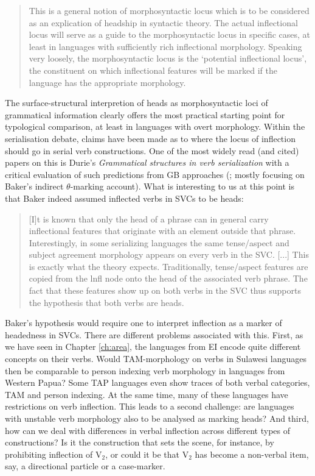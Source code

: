 \begin{quote}
This is a general notion of morphosyntactic locus which is to be considered as an explication of headship in syntactic theory. The actual inflectional locus will serve as a guide to the morphosyntactic locus in specific cases, at least in languages with sufficiently rich inflectional morphology. Speaking very loosely, the morphosyntactic locus is the `potential inflectional locus', the constituent on which inflectional features will be marked if the language has the appropriate morphology. \citep[6]{zwicky1985heads1}
\end{quote}

The surface-structural interpretion of heads as morphosyntactic loci of grammatical information clearly offers the most practical starting point for typological comparison, at least in languages with overt morphology. Within the serialisation debate, claims have been made as to where the locus of inflection should go in serial verb constructions. One of the most widely read (and cited) papers on this is Durie's \textit{Grammatical structures in verb serialization} with a critical evaluation of such predictions from GB approaches (\citealt{Durie1997}; mostly focusing on Baker's indirect $\theta$-marking account). What is interesting to us at this point is that Baker indeed assumed inflected verbs in SVCs to be heads:

\begin{quote}[I]t is known that only the head of a phrase can in general carry inflectional features that originate with an element outside that phrase. Interestingly, in some serializing languages the same tense/aspect and subject agreement morphology appears on every verb in the SVC. [...]  This is exactly what the theory expects. Traditionally, tense/aspect features are copied from the lnfl node onto the head of the associated verb phrase. The fact that these features show up on both verbs in the SVC thus supports the hypothesis that both verbs are heads. \citep[523f.]{baker1989object}
 \end{quote}
 
Baker's hypothesis would require one to interpret inflection as a marker of headedness in SVCs. There are different problems associated with this. First, as we have seen in Chapter \ref{ch:area}, the languages from EI encode quite different concepts on their verbs. Would TAM-morphology on verbs in Sulawesi languages then be comparable to person indexing verb morphology in languages from Western Papua? Some TAP languages even show traces of both verbal categories, TAM and person indexing. At the same time, many of these languages have restrictions on verb inflection. This leads to a second challenge: are languages with unstable verb morphology also to be analysed as marking heads? And third, how can we deal with differences in verbal inflection across different types of constructions? Is it the construction that sets the scene, for instance, by prohibiting inflection of V$_2$, or could it be that V$_2$ has become a non-verbal item, say, a directional particle or a case-marker.

